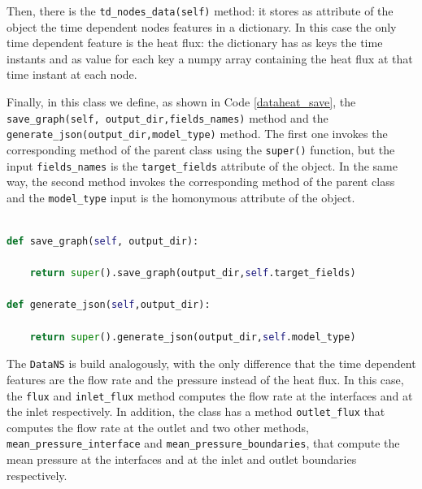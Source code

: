\documentclass[11pt,a4paper]{article}
\begin{document}
Then, there is the \texttt{td\_nodes\_data(self)} method: it stores as attribute of the object the time dependent nodes features in a dictionary. In this case the only time dependent feature is the heat flux: the dictionary has as keys the time instants and as value for each key a numpy array containing the heat flux at that time instant at each node.

Finally, in this class we define, as shown in Code \ref{dataheat_save}, the \texttt{save\_graph(self, output\_dir,fields\_names)} method and the \texttt{generate\_json(output\_dir,model\_type)} method. The first one invokes the corresponding method of the parent class using the \texttt{super()} function, but the input \texttt{fields\_names} is the \texttt{target\_fields} attribute of the object. In the same way, the second method invokes the corresponding method of the parent class and the \texttt{model\_type} input is the homonymous attribute of the object.

\begin{lstlisting}[language=Python, caption={Definition of the \texttt{save\_graph} and \texttt{generate\_json} methods of the \texttt{DataHeat} class.}, label={dataheat_save}]
    
def save_graph(self, output_dir):

    return super().save_graph(output_dir,self.target_fields)

def generate_json(self,output_dir):

    return super().generate_json(output_dir,self.model_type)
\end{lstlisting}

The \texttt{DataNS} is build analogously, with the only difference that the time dependent features are the flow rate and the pressure instead of the heat flux. In this case, the \texttt{flux} and \texttt{inlet\_flux} method computes the flow rate at the interfaces and at the inlet respectively. In addition, the class has a method \texttt{outlet\_flux} that computes the flow rate at the outlet and two other methods, \texttt{mean\_pressure\_interface} and \texttt{mean\_pressure\_boundaries}, that compute the mean pressure at the interfaces and at the inlet and outlet boundaries respectively.
\end{document}

